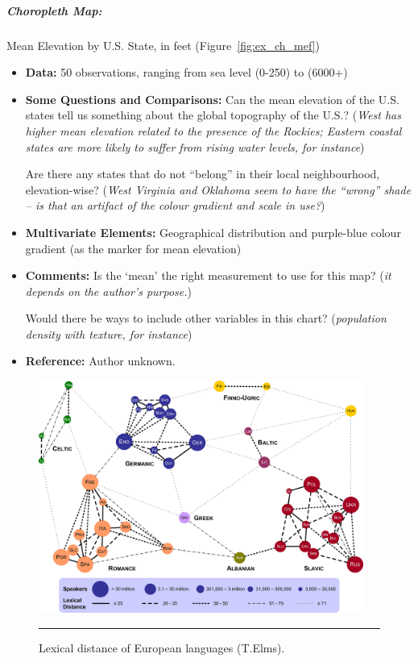 \afterpage{\FloatBarrier}
\subparagraph{Choropleth Map:} Mean Elevation by U.S. State, in feet  (Figure~\ref{fig:ex_ch_mef})
\begin{itemize}[noitemsep]
\item \textbf{Data:} 50 observations, ranging from sea level (0-250) to (6000+)
\item \textbf{Some Questions and Comparisons:} Can the mean elevation of the U.S. states tell us something about the global topography of the U.S.? (\textit{West has higher mean elevation related to the presence of the Rockies; Eastern coastal states are more likely to suffer from rising water levels, for instance})\par Are there any states that do not ``belong'' in their local neighbourhood, elevation-wise? (\textit{West Virginia and Oklahoma seem to have the ``wrong'' shade -- is that an artifact of the colour gradient and scale in use?})  \item \textbf{Multivariate Elements:} Geographical distribution and purple-blue colour gradient (as the marker for mean elevation)
\item \textbf{Comments:} Is the `mean' the right measurement to use for this map? (\textit{it depends on the author's purpose.})\par Would there be ways to include other variables in this chart? (\textit{population density with texture, for instance})
\item \textbf{Reference:} Author unknown.
\end{itemize}
\newpage \begin{figure}[t]
\centering
\includegraphics[width=0.95\textwidth]{Images/lexical.png}
\caption[\small Network Clustering: lexical distance of European languages ]{\small Lexical distance of European languages (T.Elms).} \hrule\label{fig:ex_nd_lex}
\end{figure}
